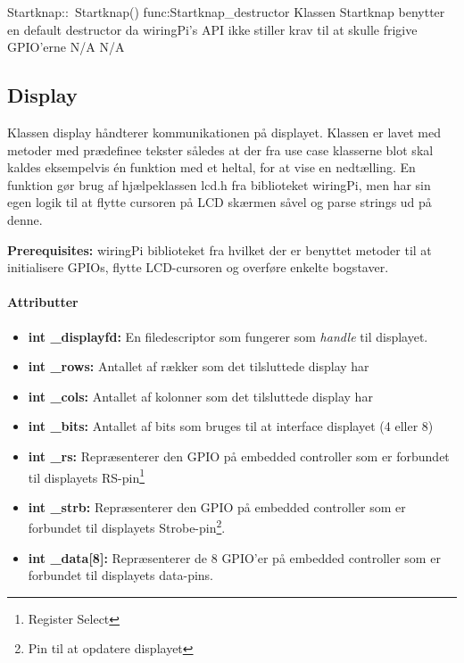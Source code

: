 \begin{functionDescription}
{Startknap::~Startknap()}
{func:Startknap_destructor}
{Klassen Startknap benytter en default destructor da wiringPi's API ikke stiller krav til at skulle frigive GPIO'erne}
{N/A}
{N/A}
\end{functionDescription}

\subsection{Display}
Klassen display håndterer kommunikationen på displayet. Klassen er lavet med metoder med prædefinee tekster således at der fra use case klasserne blot skal kaldes eksempelvis én funktion med et heltal, for at vise en nedtælling. En funktion gør brug af hjælpeklassen lcd.h fra biblioteket wiringPi\cite{2020Http://wiringpi.com/}, men har sin egen logik til at flytte cursoren på LCD skærmen såvel og parse strings ud på denne. 

\textbf{Prerequisites:} wiringPi biblioteket fra hvilket der er benyttet metoder til at initialisere GPIOs, flytte LCD-cursoren og overføre enkelte bogstaver.

\paragraph{Attributter}
\begin{itemize}
	\item \textbf{int \_displayfd:} En filedescriptor som fungerer som \textit{handle} til displayet. 
	\item \textbf{int \_rows:} Antallet af rækker som det tilsluttede display har
	\item \textbf{int \_cols:} Antallet af kolonner som det tilsluttede display har
	\item \textbf{int \_bits:} Antallet af bits som bruges til at interface displayet (4 eller 8)
	\item \textbf{int \_rs:} Repræsenterer den GPIO på embedded controller som er forbundet til displayets RS-pin\footnote{Register Select}
	\item \textbf{int \_strb:} Repræsenterer den GPIO på embedded controller som er forbundet til displayets Strobe-pin\footnote{Pin til at opdatere displayet}. 
	\item \textbf{int \_data[8]:} Repræsenterer de 8 GPIO'er på embedded controller som er forbundet til displayets data-pins.
\end{itemize}
